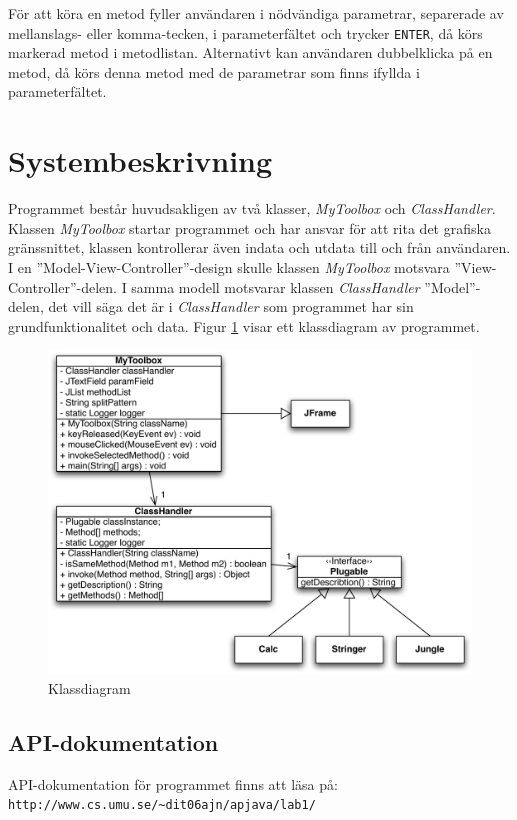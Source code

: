 \documentclass[a4paper, 12pt]{article}
\begin{document}
För att köra en metod fyller användaren i nödvändiga parametrar,
separerade av mellanslags- eller komma-tecken, i parameterfältet och
trycker \verb!ENTER!, då körs markerad metod i
metodlistan. Alternativt kan användaren dubbelklicka på en metod, då
körs denna metod med de parametrar som finns ifyllda i
parameterfältet.

\section{Systembeskrivning}
Programmet består huvudsakligen av två klasser, \textit{MyToolbox} och
\textit{ClassHandler}. Klassen \textit{MyToolbox} startar programmet
och har ansvar för att rita det grafiska gräns\-snittet, klassen
kontrollerar även indata och utdata till och från använd\-aren. I en
''Model-View-Controller''-design skulle klassen \textit{MyToolbox}
motsvara ''View-Controller''-delen. I samma modell motsvarar klassen
\textit{ClassHandler} ''Model''-delen, det vill säga det är i
\textit{ClassHandler} som programmet har sin grundfunktionalitet och
data. Figur \ref{fig:class} visar ett klassdiagram av programmet.

\begin{figure}[H]
  \begin{center}
    \includegraphics[width=130mm]{images/class.pdf}
    \caption{Klassdiagram}
    \label{fig:class}
  \end{center}
\end{figure}

\subsection{API-dokumentation}
API-dokumentation för programmet finns att läsa på:\\
\verb!http://www.cs.umu.se/~dit06ajn/apjava/lab1/!
\end{document}
